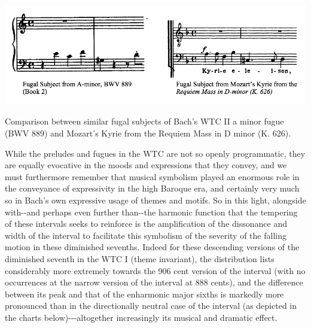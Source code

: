 \begin{Example}[H]
\centering
\includegraphics{kyrie_text.png}
\caption{Comparison between similar fugal subjects of Bach's WTC II a minor fugue (BWV 889) and Mozart's Kyrie from the Requiem Mass in D minor (K. 626).}
\end{Example}
    While the preludes and fugues in the WTC are not so openly programmatic,
they are equally evocative in the moods and expressions that they
convey, and we must furthermore remember that musical symbolism played
an enormous role in the conveyance of expressivity in the high Baroque
era, and certainly very much so in Bach's own expressive usage of themes
and motifs. So in this light, alongside with-\/-and perhaps even further
than-\/-the harmonic function that the tempering of these intervals
seeks to reinforce is the amplification of the dissonance and width of
the interval to facilitate this symbolism of the severity of the falling
motion in these diminished sevenths. Indeed for these descending
versions of the diminished seventh in the WTC I (theme invariant), the
distribution lists considerably more extremely towards the 906 cent
version of the interval (with no occurrences at the narrow version of
the interval at 888 cents), and the difference between its peak and that
of the enharmonic major sixths is markedly more pronounced than in the
directionally neutral case of the interval (as depicted in the charts
below)-\/-\/-altogether increasingly its musical and dramatic effect.


    \begin{center}
    \end{center}
    

    \begin{center}
    \end{center}
    

